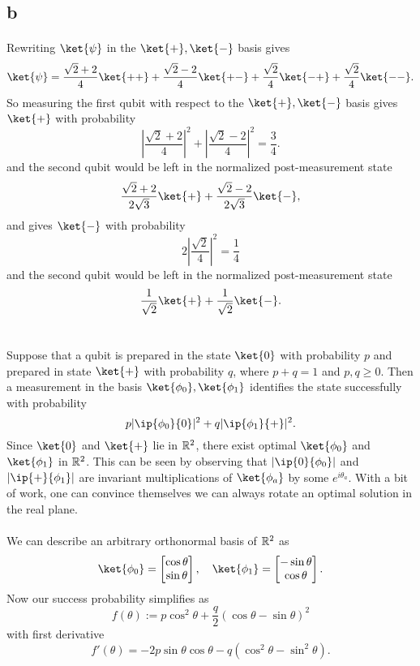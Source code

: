 \documentclass[letterpaper,12pt,oneside,onecolumn]{article}
\DeclarePairedDelimiter\abs{\lvert}{\rvert}%
\begin{document}
\subsection{b}
\paragraph{}
Rewriting $\ket{\psi}$ in the $\ket{+}, \ket{-}$ basis gives
$$\ket{\psi} = \frac{\sqrt{2} + 2}{4}\ket{++} + \frac{\sqrt{2}-2}{4}\ket{+-} + \frac{\sqrt{2}}{4}\ket{-+} + \frac{\sqrt{2}}{4}\ket{--}.$$
So measuring the first qubit with respect to the $\ket{+}, \ket{-}$ basis gives $\ket{+}$ with probability
$$|\frac{\sqrt{2}+2}{4}|^2+ |\frac{\sqrt{2}-2}{4}|^2 = \frac{3}{4}.$$
and the second qubit would be left in the normalized post-measurement state
$$ \frac{\sqrt{2} + 2}{2\sqrt{3}}\ket{+} + \frac{\sqrt{2}-2}{2\sqrt{3}}\ket{-},$$
and gives $\ket{-}$ with probability
$$2|\frac{\sqrt{2}}{4}|^2 = \frac{1}{4}$$
and the second qubit would be left in the normalized post-measurement state
$$\frac{1}{\sqrt{2}}\ket{+} + \frac{1}{\sqrt{2}}\ket{-} .$$
\section{}
\paragraph{}
Suppose that a qubit is prepared in the state $\ket{0}$ with probability $p$ and prepared in state $\ket{+}$ with probability $q$, where $p+q=1$ and $p,q\geq 0$. Then a measurement in the basis $\ket{\phi_0}, \ket{\phi_1}$ identifies the state successfully with probability
$$p\abs{\ip{\phi_0}{0}}^2 + q\abs{\ip{\phi_1}{+}}^2.$$
Since $\ket{0}$ and $\ket{+}$ lie in $\mathbb{R}^2$, there exist optimal $\ket{\phi_0}$ and $\ket{\phi_1}$ in $\mathbb{R}^2$. This can be seen by observing that $\abs{\ip{0}{\phi_0}}$ and $\abs{\ip{+}{\phi_1}}$ are invariant multiplications of $\ket{\phi_a}$ by some $e^{i\theta_a}$. With a bit of work, one can convince themselves we can always rotate an optimal solution in the real plane.
\paragraph{}
We can describe an arbitrary orthonormal basis of $\mathbb{R}^2$ as
$$\ket{\phi_0} = \begin{bmatrix} \cos\theta \\ \sin\theta \end{bmatrix}, \quad \ket{\phi_1}=\begin{bmatrix}-\sin\theta \\ \cos\theta \end{bmatrix}.$$
Now our success probability simplifies as
$$f(\theta) :=p\cos^2\theta + \frac{q}{2}(\cos\theta - \sin\theta)^2$$
with first derivative
$$f'(\theta) = -2p\sin\theta\cos\theta - q(\cos^2\theta - \sin^2\theta).$$
\end{document}
